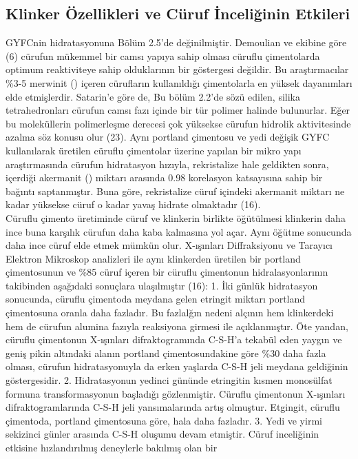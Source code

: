 \documentclass[12pt]{article}
\begin{document}
\subsection{Klinker Özellikleri ve Cüruf İnceliğinin Etkileri}
GYFCnin hidratasyonuna Bölüm 2.5’de değinilmiştir. Demoulian ve
ekibine göre (6) cürufun mükemmel bir camsı yapıya sahip olması cüruflu
çimentolarda optimum reaktiviteye sahip olduklarının bir göstergesi değildir.
Bu araştırmacılar \%3-5 merwinit () içeren cürufların kullanıldığı
çimentolarla en yüksek dayanımları elde etmişlerdir.
Satarin’e göre de, Bu bölüm 2.2’de sözü edilen, silika tetrahedronları cürufun
camsı fazı içinde bir tür polimer halinde bulunurlar. Eğer bu moleküllerin
polimerleşme derecesi çok yüksekse cürufun hidrolik aktivitesinde azalma
söz konusu olur (23).
Aynı portland çimentosu ve yedi değişik GYFC kullanılarak üretilen cüruflu
çimentolar üzerine yapılan bir mikro yapı araştırmasında cürufun hidratasyon
hızıyla, rekristalize hale geldikten sonra, içerdiği akermanit () miktarı
arasında 0.98 korelasyon katsayısına sahip bir bağıntı saptanmıştır. Buna
göre, rekristalize cüruf içindeki akermanit miktarı ne kadar yüksekse cüruf o
kadar yavaş hidrate olmaktadır (16).\\[9pt]
Cüruflu çimento üretiminde cüruf ve klinkerin birlikte öğütülmesi klinkerin daha
ince buna karşılık cürufun daha kaba kalmasına yol açar. Aynı öğütme
sonucunda daha ince cüruf elde etmek mümkün olur.
X-ışınları Diffraksiyonu ve Tarayıcı Elektron Mikroskop analizleri ile aynı
klinkerden üretilen bir portland çimentosunun ve \%85 cüruf içeren bir cüruflu
çimentonun hidralasyonlarının takibinden aşağıdaki sonuçlara ulaşılmıştır
(16):
1. İki günlük hidratasyon sonucunda, cüruflu çimentoda meydana gelen
etringit miktarı portland çimentosuna oranla daha fazladır. Bu fazlalğın
nedeni alçının hem klinkerdeki  hem de cürufun alumina fazıyla
reaksiyona girmesi ile açıklanmıştır. Öte yandan, cüruflu çimentonun
X-ışınları difraktogramında C-S-H’a tekabül eden yaygın ve geniş pikin
altındaki alanın portland çimentosundakine göre \%30 daha fazla olması,
cürufun hidratasyonuyla da erken yaşlarda C-S-H jeli meydana geldiğinin
göstergesidir.
2. Hidratasyonun yedinci gününde etringitin kısmen monosülfat formuna
transformasyonun başladığı gözlenmiştir. Cüruflu çimentonun X-ışınları
difraktogramlarında C-S-H jeli yansımalarında artış olmuştur. Etgingit,
cüruflu çimentoda, portland çimentosuna göre, hala daha fazladır.
3. Yedi ve yirmi sekizinci günler arasında C-S-H oluşumu devam etmiştir.
Cüruf inceliğinin etkisine hızlandırılmış deneylerle bakılmış olan bir
\end{document}
